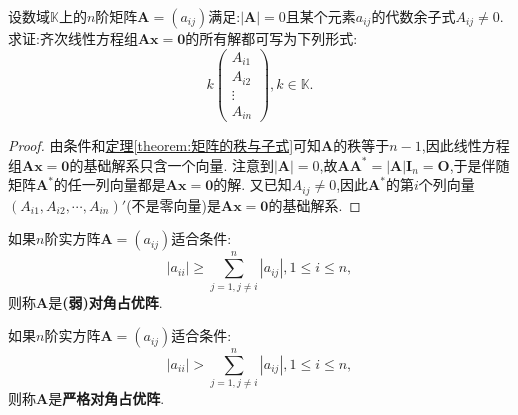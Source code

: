 \documentclass[../../main.tex]{subfiles}%
\begin{document}
\begin{proposition}\label{proposition:奇异系数矩阵Ax=0的解空间}
设数域\(\mathbb{K}\)上的\(n\)阶矩阵\(\boldsymbol{A}=(a_{ij})\)满足:\(|\boldsymbol{A}| = 0\)且某个元素\(a_{ij}\)的代数余子式\(A_{ij}\neq0\). 求证:齐次线性方程组\(\boldsymbol{A}\boldsymbol{x}=\boldsymbol{0}\)的所有解都可写为下列形式:
\[
k\begin{pmatrix}
A_{i1}\\
A_{i2}\\
\vdots\\
A_{in}
\end{pmatrix},k\in\mathbb{K}.
\]
\end{proposition}
\begin{proof}
由条件和\hyperref[theorem:矩阵的秩与子式]{定理\ref{theorem:矩阵的秩与子式}}可知\(\boldsymbol{A}\)的秩等于\(n - 1\),因此线性方程组\(\boldsymbol{A}\boldsymbol{x}=\boldsymbol{0}\)的基础解系只含一个向量. 注意到\(|\boldsymbol{A}| = 0\),故\(\boldsymbol{A}\boldsymbol{A}^*=|\boldsymbol{A}|\boldsymbol{I}_n=\boldsymbol{O}\),于是伴随矩阵\(\boldsymbol{A}^*\)的任一列向量都是\(\boldsymbol{A}\boldsymbol{x}=\boldsymbol{0}\)的解. 又已知\(A_{ij}\neq0\),因此\(\boldsymbol{A}^*\)的第\(i\)个列向量\((A_{i1},A_{i2},\cdots,A_{in})'\)(不是零向量)是\(\boldsymbol{A}\boldsymbol{x}=\boldsymbol{0}\)的基础解系.   
\end{proof}

\begin{definition}[对角占优阵]\label{definition:对角占优阵}
如果\(n\)阶实方阵\(\boldsymbol{A}=(a_{ij})\)适合条件:
\[
|a_{ii}|\geqslant \sum_{j = 1,j\neq i}^{n}|a_{ij}|,1\leqslant  i\leqslant  n,
\]
则称\(\boldsymbol{A}\)是\textbf{(弱)对角占优阵}.

如果\(n\)阶实方阵\(\boldsymbol{A}=(a_{ij})\)适合条件:
\[
|a_{ii}|>\sum_{j = 1,j\neq i}^{n}|a_{ij}|,1\leqslant  i\leqslant  n,
\]
则称\(\boldsymbol{A}\)是\textbf{严格对角占优阵}.
\end{definition}
\end{document}
